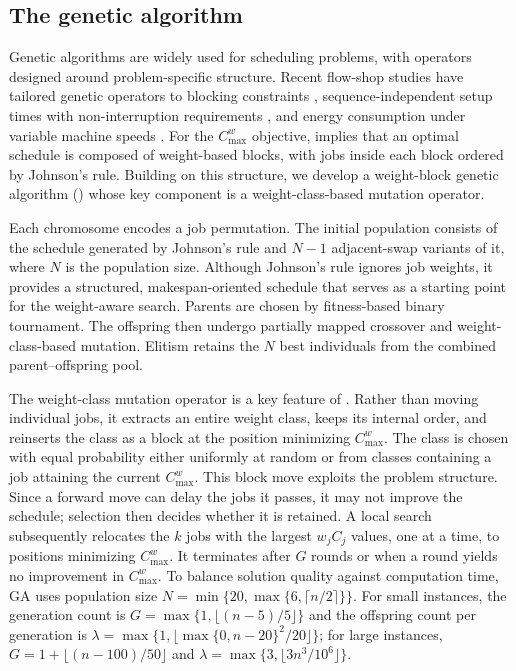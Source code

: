 \documentclass[12pt]{article} \textheight=24.5cm \textwidth=16.5cm \parskip = 0.165cm
\begin{document}
\begin{sloppypar}
        \subsection{The genetic algorithm} \label{sec:ga}
        
        Genetic algorithms are widely used for scheduling problems, with operators designed around problem-specific structure. Recent flow-shop studies have tailored genetic operators to blocking constraints \citep{deAthaydePrataFuchigami2024JIM}, sequence-independent setup times with non-interruption requirements \citep{QiaoWuHeLi2022ESA}, and energy consumption under variable machine speeds \citep{WangWang2023EAAI}. For the 
        $C_{\max}^w$ objective,  implies that an optimal schedule is composed of weight-based blocks, with jobs inside each block ordered by Johnson's rule. Building on this structure, we develop a weight-block genetic algorithm () whose key component is a weight-class-based mutation operator.
        
        Each chromosome encodes a job permutation. The initial population consists of the schedule generated by Johnson's rule and $N-1$ adjacent-swap variants of it, where $N$ is the population size. Although Johnson's rule ignores job weights, it provides a structured, makespan-oriented schedule that serves as a starting point for the weight-aware search. Parents are chosen by fitness-based binary tournament. The offspring then undergo partially mapped crossover and weight-class-based mutation. Elitism retains the $N$ best individuals from the combined parent–offspring pool.
        
        The weight-class mutation operator is a key feature of . Rather than moving individual jobs, it extracts an entire weight class, keeps its internal order, and reinserts the class as a block at the position minimizing $C_{\max}^w$. The class is chosen with equal probability either uniformly at random or from classes containing a job attaining the current $C_{\max}^w$. This block move exploits the problem structure. Since a forward move can delay the jobs it passes, it may not improve the schedule; selection then decides whether it is retained. A local search subsequently relocates the $k$ jobs with the largest $w_j C_j$ values, one at a time, to positions minimizing $C_{\max}^w$. It terminates after $G$ rounds or when a round yields no improvement in $C_{\max}^w$. To balance solution quality against computation time, GA uses population size $N=\min\{20,\max\{6,\lceil n/2\rceil\}\}$. For small instances, the generation count is $G=\max\{1,\lfloor(n-5)/5\rfloor\}$ and the offspring count per generation is $\lambda=\max\{1,\lfloor\max\{0,n-20\}^2/20\rfloor\}$; for large instances, $G=1+\lfloor(n-100)/50\rfloor$ and $\lambda=\max\{3,\lfloor 3n^3/10^6\rfloor\}$. 
        

\end{sloppypar}
\end{document}
